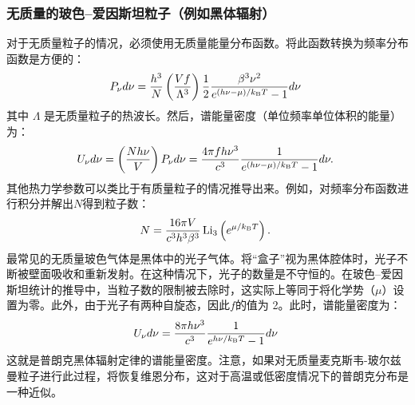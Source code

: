 \subsubsection{无质量的玻色–爱因斯坦粒子（例如黑体辐射）}  
对于无质量粒子的情况，必须使用无质量能量分布函数。将此函数转换为频率分布函数是方便的：
\[
P_{\nu} d\nu = \frac{h^3}{N} \left( \frac{Vf}{\Lambda^3} \right) \frac{1}{2} \frac{\beta^3 \nu^2}{e^{(h\nu - \mu) / k_{\rm B} T} - 1} d\nu~
\]
其中 \( \Lambda \) 是无质量粒子的热波长。然后，谱能量密度（单位频率单位体积的能量）为：
\[
U_{\nu} d\nu = \left( \frac{N h \nu}{V} \right) P_{\nu} d\nu = \frac{4 \pi f h \nu^3}{c^3} \frac{1}{e^{(h\nu - \mu) / k_{\rm B} T} - 1} d\nu.~
\]
其他热力学参数可以类比于有质量粒子的情况推导出来。例如，对频率分布函数进行积分并解出\(N\)得到粒子数：
\[
N = \frac{16 \pi V}{c^3 h^3 \beta^3} \, \mathrm{Li}_3 \left( e^{\mu / k_{\rm B} T} \right).~
\]
最常见的无质量玻色气体是黑体中的光子气体。将“盒子”视为黑体腔体时，光子不断被壁面吸收和重新发射。在这种情况下，光子的数量是不守恒的。在玻色–爱因斯坦统计的推导中，当粒子数的限制被去除时，这实际上等同于将化学势（\(\mu\)）设置为零。此外，由于光子有两种自旋态，因此\(f\)的值为 2。此时，谱能量密度为：
\[
U_{\nu} d\nu = \frac{8 \pi h \nu^3}{c^3} \frac{1}{e^{h\nu / k_{\rm B} T} - 1} d\nu~
\]
这就是普朗克黑体辐射定律的谱能量密度。注意，如果对无质量麦克斯韦-玻尔兹曼粒子进行此过程，将恢复维恩分布，这对于高温或低密度情况下的普朗克分布是一种近似。